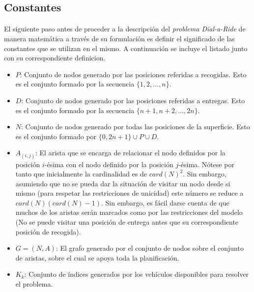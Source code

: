 \documentclass{subfiles}
\begin{document}
      \subsection{Constantes}
      \label{sec:formulation_constants}

        \paragraph{}
        El siguiente paso antes de proceder a la descripción del \emph{problema Dial-a-Ride} de manera matemática a través de su formulación es definir el significado de las constantes que se utilizan en el mismo. A continuación se incluye el listado junto con su correspondiente definicion.

        \begin{itemize}

          \item $P$: Conjunto de nodos  generado por las posiciones referidas a recogidas. Esto es el conjunto formado por la secuencia $\{1, 2, ..., n\}$.

          \item $D$: Conjunto de nodos  generado por las posiciones referidas a entregas. Esto es el conjunto formado por la secuencia $\{n + 1, n + 2, ..., 2n\}$.

          \item $N$: Conjunto de nodos generado por todas las posiciones de la superficie. Esto es el conjunto formado por $\{0, 2n +1 \} \cup P \cup D$.

          \item $A_{(i, j)}$: El arista que se encarga de relacionar el nodo definidos por la posición $i$-ésima con el nodo definido por la posición $j$-ésima. Nótese por tanto que inicialmente la cardinalidad es de $card(N) ^2$. Sin embargo, asumiendo que no se pueda dar la situación de visitar un nodo desde si mismo (para respetar las restricciones de unicidad) este número se reduce a $card(N) (card(N) - 1)$. Sin embargo, es fácil darse cuenta de que muchos de los aristas serán marcados como  por las restricciones del modelo (No se puede visitar una posición de entrega antes que su correspondiente posición de recogida).

          \item $G = (N, A)$: El grafo generado por el conjunto de nodos sobre el conjunto de aristas, sobre el cual se apoya toda la planificación.

          \item $K_{k}$: Conjunto de índices generados por los vehículos disponibles para resolver el problema.


\end{itemize}
\end{document}
